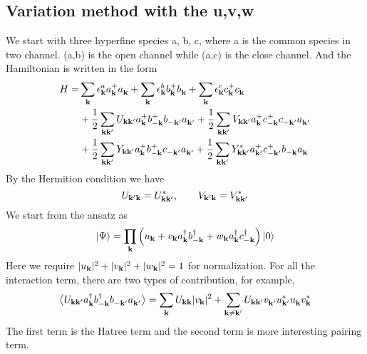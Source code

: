 \subsection{Variation method with the u,v,w}
We start with three hyperfine species a, b, c, where a is the common species in two channel. (a,b) is the open channel while (a,c) is the close channel. And the Hamiltonian is written in the form 
\begin{equation}
\begin{split}
 H=&\sum_\vk\epsilon^a_\vk{}a^+_\vk{}a^{}_\vk+\sum_\vk\epsilon^b_\vk{}b^+_\vk{}b^{}_\vk+\sum_\vk\epsilon^c_\vk{}c^+_\vk{}c^{}_\vk\\
  &+\nth{2}\sum_{\vk\vk'}U_{\vk\vk'}a^+_\vk{}b^+_{-\vk}{}b^{}_{-\vk'}a^{}_{\vk'}
	+\nth{2}\sum_{\vk\vk'}V_{\vk\vk'}a^+_\vk{}c^+_{-\vk}{}c^{}_{-\vk'}a^{}_{\vk'}\\
 &+\nth{2}\sum_{\vk\vk'}Y_{\vk\vk'}a^+_\vk{}b^+_{-\vk}{}c^{}_{-\vk'}a^{}_{\vk'}
	+\nth{2}\sum_{\vk\vk'}Y^*_{\vk\vk'}a^+_{\vk'}{}c^+_{-\vk'}{}b^{}_{-\vk}a^{}_{\vk}
\end{split} 
\end{equation}
By the Hermition condition we have 
\begin{equation}
 U_{\vk'\vk}=U^*_{\vk\vk'},\qquad{} V_{\vk'\vk}=V^*_{\vk\vk'}
\end{equation}
  We start from the ansatz as 
\begin{equation}\label{eq:ansatz}
 \ket{\Psi}=\prod_\vk\br{u_\vk+v_\vk{}a^\dg_\vk{}b^\dg_{-\vk}+w_\vk{}a^\dg_\vk{}c^\dg_{-\vk}}\ket{0}
\end{equation}
Here we require $\abs{u_\vk}^2+\abs{v_\vk}^2+\abs{w_\vk}^2=1$ for normalization.  For all the interaction term, there are two types of contribution,
for example, 
\begin{equation*}
\av{U_{\vk\vk'}a^\dg_\vk{}b^\dg_{-\vk}{}b^{}_{-\vk'}a^{}_{\vk'}}
=\sum_{\vk}U_{\vk\vk}\abs{v_\vk}^2+\sum_{\vk\neq\vk'}U_{\vk\vk'}v^{}_{\vk'}u^*_{\vk'}u^{}_\vk{}v^*_\vk
\end{equation*}
The first term is the Hatree term and the second term is more interesting pairing term.



